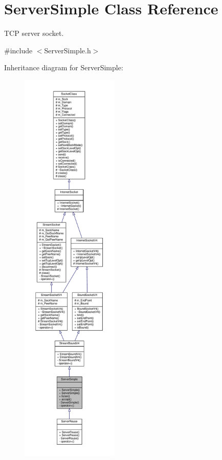 \hypertarget{classServerSimple}{}\section{Server\+Simple Class Reference}
\label{classServerSimple}


T\+CP server socket.  




{\ttfamily \#include $<$Server\+Simple.\+h$>$}



Inheritance diagram for Server\+Simple\+:\nopagebreak
\begin{figure}[H]
\begin{center}
\leavevmode
\includegraphics[height=550pt]{classServerSimple__inherit__graph}
\end{center}
\end{figure}
